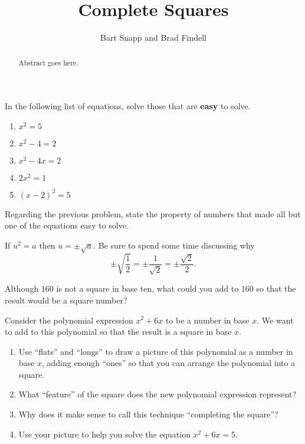 \documentclass{ximera}
\title{Complete Squares}
\author{Bart Snapp and Brad Findell}
\begin{document}
\begin{abstract}
Abstract goes here.  
\end{abstract}
\maketitle

\label{A:completeSquares}

\begin{problem}
In the following list of equations, solve those that are \textbf{easy} to solve.  
\begin{enumerate}
\item $x^2=5$
\item $x^2 - 4 = 2$
\item $x^2 - 4x = 2$
\item $2x^2=1$
\item $(x-2)^2=5$
\end{enumerate}
\end{problem}
\vspace{0.3in}

\begin{problem}
Regarding the previous problem, state the property of numbers that made all but one of the equations easy to solve.  
\begin{teachingnote}
If $u^2=a$ then $u=\pm\sqrt{a}$.  Be sure to spend some time discussing why 
$$\pm\sqrt{\frac{1}{2}}=\pm\frac{1}{\sqrt{2}}=\pm\frac{\sqrt{2}}{2}.$$
\end{teachingnote}
\vspace{0.3in}
\end{problem}

\begin{problem}
Although $160$ is not a square in base ten, what could you add to $160$ so that the result would be a square number?  
\end{problem}

\begin{problem}
 Consider the polynomial expression $x^2+6x$ to be a number in base $x$.  We want to add to this polynomial so that the result is a square in base $x$.  
\begin{enumerate}
\item Use ``flats'' and ``longs'' to draw a picture of this polynomial as a number in base $x$, adding enough ``ones'' so that you can arrange the polynomial into a square.  
\vspace{0.5in}
\item What ``feature'' of the square does the new polynomial expression represent?  
\item Why does it make sense to call this technique ``completing the square''? 
\item Use your picture to help you solve the equation $x^2+6x=5$.  
\end{enumerate}
\end{problem}
\end{document}
